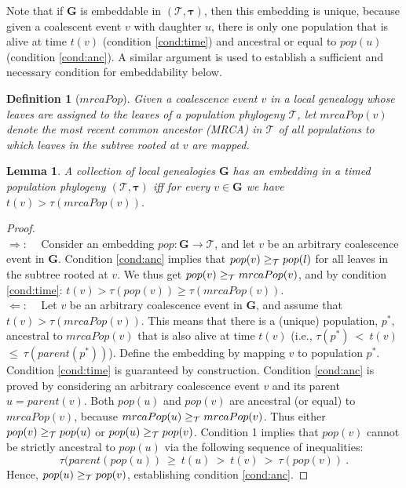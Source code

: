 \documentclass[11pt]{article}
\newcommand{\vect}[1]{\boldsymbol{\mathbf{#1}}}
\newcommand{\Tr}{\mathcal{T}}
\newcommand{\G}{\vect{G}}
\newcommand{\1}{\mathbbm{1}}
\newtheorem{lemma}{Lemma}
\newtheorem{definition}{Definition}
\newcommand{\taus}{\vect\tau}
\begin{document}
%
%
Note that if $\G$ is embeddable in $(\Tr,\taus)$, then this embedding is unique, because given a coalescent event $v$ with daughter $u$,
there is only one population that is  alive at time $t(v)$ (condition \ref{cond:time}) and ancestral or equal to $pop(u)$ (condition \ref{cond:anc}).
%
A similar argument is used to establish a sufficient and necessary condition for embeddability below.
%
\begin{definition}[$mrcaPop$]\label{def:tmrca_pop}
 Given a coalescence event $v$ in a local genealogy whose leaves are assigned to the leaves of a population phylogeny $\Tr$,
 let ${mrcaPop(v)}$ denote the most recent common ancestor (MRCA) in $\Tr$ of all populations to which leaves in the subtree rooted at $v$ are mapped. %
\end{definition}

\begin{lemma}\label{lem:embed}
 A collection of local genealogies $\G$ has an embedding in a timed population phylogeny $(\Tr,\taus)$ iff for every $v\in\G$ we have $t(v) > \tau(mrcaPop(v))$.
\end{lemma}
\begin{proof}
 ~\\
 $\Rightarrow$:~~ Consider an embedding $pop:\G\rightarrow\Tr$, and let $v$ be an arbitrary coalescence event in $\G$.
 Condition \ref{cond:anc} implies that $pop(v)\anc pop(l)$ for all leaves in the subtree rooted at $v$. %
 We thus get $pop(v)\anc mrcaPop(v)$, and by condition \ref{cond:time}: $t(v) > \tau(pop(v)) \geq \tau(mrcaPop(v))$.\\
 $\Leftarrow$:~~ Let $v$ be an arbitrary coalescence event in $\G$, and assume that $t(v) > \tau(mrcaPop(v))$. This means that there is a (unique) population, $p^*$,
 ancestral to $mrcaPop(v)$ that is also alive at time $t(v)$ (i.e., $\tau(p^*) ~<~ t(v)$\\
 $\leq~ \tau(parent(p^*))$). Define the embedding by mapping $v$ to population $p^*$.
 Condition \ref{cond:time} is guaranteed by construction. 
 Condition \ref{cond:anc} is proved by considering an arbitrary coalescence event $v$ and its parent $u=parent(v)$.
 Both $pop(u)$ and $pop(v)$ are ancestral (or equal) to $mrcaPop(v)$, because $mrcaPop(u)\anc mrcaPop(v)$.
 Thus either $pop(v)\anc pop(u)$ or $pop(u)\anc pop(v)$.
 Condition 1  implies that $pop(v)$ cannot be strictly ancestral to $pop(u)$ via the following sequence of inequalities:
 $$\tau(parent(pop(u)) ~\geq~ t(u) ~>~ t(v) ~>~ \tau(pop(v))~.$$
 Hence, $pop(u)\anc pop(v)$, establishing condition \ref{cond:anc}.
\end{proof}
\end{document}
